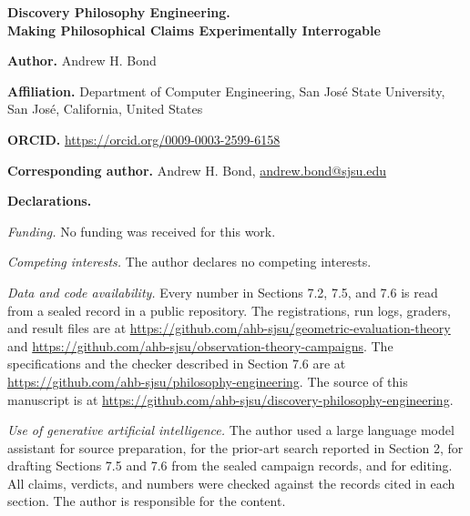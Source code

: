 \documentclass[11pt]{article}
\begin{document}
\begin{center}
{\Large\bfseries Discovery Philosophy Engineering.\\[2pt]
Making Philosophical Claims Experimentally Interrogable}
\end{center}

\vspace{1.5em}

\noindent\textbf{Author.} Andrew H. Bond

\noindent\textbf{Affiliation.} Department of Computer Engineering, San Jos\'e State
University, San Jos\'e, California, United States

\noindent\textbf{ORCID.} \url{https://orcid.org/0009-0003-2599-6158}

\noindent\textbf{Corresponding author.} Andrew H. Bond,
\href{mailto:andrew.bond@sjsu.edu}{andrew.bond@sjsu.edu}

\vspace{1.5em}

\noindent\textbf{Declarations.}

\vspace{0.5em}

\noindent\emph{Funding.} No funding was received for this work.

\noindent\emph{Competing interests.} The author declares no competing interests.

\noindent\emph{Data and code availability.} Every number in Sections 7.2, 7.5, and
7.6 is read from a sealed record in a public repository. The registrations, run
logs, graders, and result files are at
\url{https://github.com/ahb-sjsu/geometric-evaluation-theory} and
\url{https://github.com/ahb-sjsu/observation-theory-campaigns}. The
specifications and the checker described in Section 7.6 are at
\url{https://github.com/ahb-sjsu/philosophy-engineering}. The source of this
manuscript is at
\url{https://github.com/ahb-sjsu/discovery-philosophy-engineering}.

\noindent\emph{Use of generative artificial intelligence.} The author used a large
language model assistant for source preparation, for the prior-art search reported
in Section 2, for drafting Sections 7.5 and 7.6 from the sealed campaign records,
and for editing. All claims, verdicts, and numbers were checked against the records
cited in each section. The author is responsible for the content.
\end{document}
